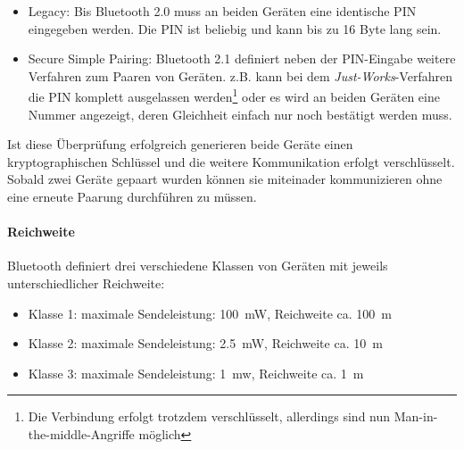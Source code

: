                 \begin{itemize}
                    \item{Legacy:} Bis Bluetooth 2.0 muss an beiden Geräten eine identische PIN
                                   eingegeben werden. Die PIN ist beliebig und kann bis zu
                                   16 Byte lang sein.
                    \item{Secure Simple Pairing:} Bluetooth 2.1 definiert neben der PIN-Eingabe
                                                  weitere Verfahren zum Paaren von Geräten.
                                                  z.B. kann bei dem \textsl{Just-Works}-Verfahren
                                                  die PIN komplett ausgelassen werden\footnote{Die
                                                  Verbindung erfolgt trotzdem verschlüsselt,
                                                  allerdings sind nun Man-in-the-middle-Angriffe 
                                                  möglich} oder es wird an beiden Geräten eine
                                                  Nummer angezeigt, deren Gleichheit einfach
                                                  nur noch bestätigt werden muss.
                \end{itemize}

                Ist diese Überprüfung erfolgreich generieren beide Geräte einen kryptographischen
                Schlüssel und die weitere Kommunikation erfolgt verschlüsselt. Sobald zwei
                Geräte gepaart wurden können sie miteinader kommunizieren ohne eine erneute
                Paarung durchführen zu müssen.

            \paragraph{Reichweite}
                Bluetooth definiert drei verschiedene Klassen von Geräten mit jeweils
                unterschiedlicher Reichweite:

                \begin{itemize}
                    \item{Klasse 1:} maximale Sendeleistung: 100~mW, Reichweite ca. 100~m
                    \item{Klasse 2:} maximale Sendeleistung: 2.5~mW, Reichweite ca. 10~m
                    \item{Klasse 3:} maximale Sendeleistung:   1~mw, Reichweite ca. 1~m
                \end{itemize}


